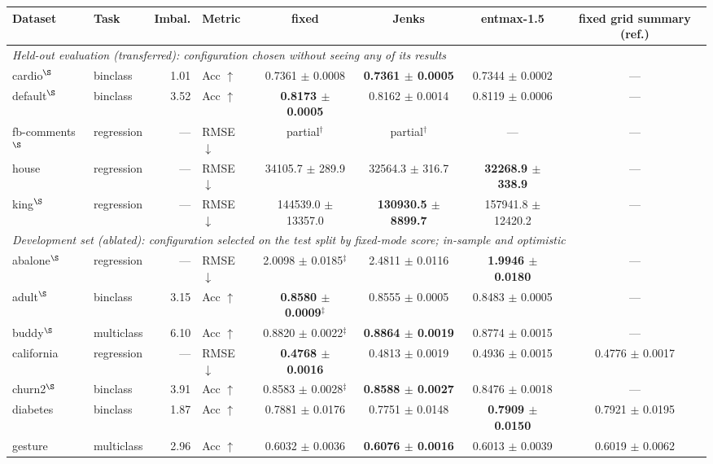 \begin{table}[t]
\centering\small
\begin{tabular}{llrlcccc}
\toprule
Dataset & Task & Imbal. & Metric & fixed & Jenks & entmax-1.5 & fixed grid summary (ref.) \\
\midrule
\multicolumn{8}{l}{\textit{Held-out evaluation (transferred): configuration chosen without seeing any of its results}} \\
cardio$^\S$ & binclass & 1.01 & Acc $\uparrow$ & 0.7361 $\pm$ 0.0008 & \textbf{0.7361 $\pm$ 0.0005} & 0.7344 $\pm$ 0.0002 & --- \\
default$^\S$ & binclass & 3.52 & Acc $\uparrow$ & \textbf{0.8173 $\pm$ 0.0005} & 0.8162 $\pm$ 0.0014 & 0.8119 $\pm$ 0.0006 & --- \\
fb-comments$^\S$ & regression & — & RMSE $\downarrow$ & partial$^\dagger$ & partial$^\dagger$ & --- & --- \\
house & regression & — & RMSE $\downarrow$ & 34105.7 $\pm$ 289.9 & 32564.3 $\pm$ 316.7 & \textbf{32268.9 $\pm$ 338.9} & --- \\
king$^\S$ & regression & — & RMSE $\downarrow$ & 144539.0 $\pm$ 13357.0 & \textbf{130930.5 $\pm$ 8899.7} & 157941.8 $\pm$ 12420.2 & --- \\
\midrule
\multicolumn{8}{l}{\textit{Development set (ablated): configuration selected on the test split by fixed-mode score; in-sample and optimistic}} \\
abalone$^\S$ & regression & — & RMSE $\downarrow$ & 2.0098 $\pm$ 0.0185$^\ddagger$ & 2.4811 $\pm$ 0.0116 & \textbf{1.9946 $\pm$ 0.0180} & --- \\
adult$^\S$ & binclass & 3.15 & Acc $\uparrow$ & \textbf{0.8580 $\pm$ 0.0009}$^\ddagger$ & 0.8555 $\pm$ 0.0005 & 0.8483 $\pm$ 0.0005 & --- \\
buddy$^\S$ & multiclass & 6.10 & Acc $\uparrow$ & 0.8820 $\pm$ 0.0022$^\ddagger$ & \textbf{0.8864 $\pm$ 0.0019} & 0.8774 $\pm$ 0.0015 & --- \\
california & regression & — & RMSE $\downarrow$ & \textbf{0.4768 $\pm$ 0.0016} & 0.4813 $\pm$ 0.0019 & 0.4936 $\pm$ 0.0015 & 0.4776 $\pm$ 0.0017 \\
churn2$^\S$ & binclass & 3.91 & Acc $\uparrow$ & 0.8583 $\pm$ 0.0028$^\ddagger$ & \textbf{0.8588 $\pm$ 0.0027} & 0.8476 $\pm$ 0.0018 & --- \\
diabetes & binclass & 1.87 & Acc $\uparrow$ & 0.7881 $\pm$ 0.0176 & 0.7751 $\pm$ 0.0148 & \textbf{0.7909 $\pm$ 0.0150} & 0.7921 $\pm$ 0.0195 \\
gesture & multiclass & 2.96 & Acc $\uparrow$ & 0.6032 $\pm$ 0.0036 & \textbf{0.6076 $\pm$ 0.0016} & 0.6013 $\pm$ 0.0039 & 0.6019 $\pm$ 0.0062 \\

\end{tabular}
\end{table}
